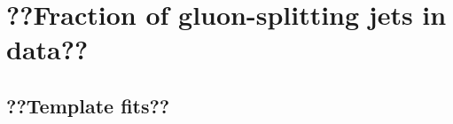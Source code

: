 %
%
\chapter{??Fraction of gluon-splitting jets in data??}\label{ch:gbbfraction}

\section{??Template fits??}\label{sec:FractionSystematics}

